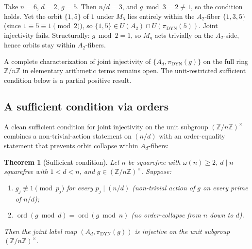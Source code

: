 \documentclass[11pt,reqno]{amsart}
\theoremstyle{plain}
\newtheorem{theorem}{Theorem}[section]
\theoremstyle{definition}
\theoremstyle{remark}
\DeclareMathOperator{\ord}{ord}
\DeclareMathOperator{\dyn}{DYN}
\newcommand{\Z}{\mathbb{Z}}
\begin{document}
\begin{example}\label{ex:converse-fails}
Take $n = 6$, $d = 2$, $g = 5$. Then $n/d = 3$, and $g \bmod 3 = 2
\not\equiv 1$, so the condition holds. Yet the orbit $\{1, 5\}$ of
$1$ under $M_{5}$ lies entirely within the $A_{2}$-fiber $\{1, 3, 5\}$
(since $1 \equiv 5 \equiv 1 \pmod 2$), so $\{1, 5\} \in U(A_{2})
\cap U(\pi_{\dyn}(5))$. Joint injectivity fails. Structurally: $g
\bmod 2 = 1$, so $M_{g}$ acts trivially on the $A_{2}$-side, hence
orbits stay within $A_{2}$-fibers.
\end{example}

A complete characterization of joint injectivity of $\{A_{d},
\pi_{\dyn}(g)\}$ on the full ring $\Z/n\Z$ in elementary
arithmetic terms remains open. The unit-restricted sufficient
condition below is a partial positive result.

\subsection{A sufficient condition via orders}

A clean sufficient condition for joint injectivity on the unit
subgroup $(\Z/n\Z)^{\times}$ combines a non-trivial-action statement
on $(n/d)$ with an order-equality statement that prevents orbit
collapse within $A_{d}$-fibers:

\begin{theorem}[Sufficient condition]\label{thm:joint-sufficient}
Let $n$ be squarefree with $\omega(n) \ge 2$, $d \mid n$ squarefree
with $1 < d < n$, and $g \in (\Z/n\Z)^{\times}$. Suppose:
\begin{enumerate}[label={\upshape(\roman*)}]
\item $g_{j} \not\equiv 1 \pmod{p_{j}}$ for every $p_{j} \mid (n/d)$
\quad (non-trivial action of $g$ on every prime of $n/d$);
\item $\ord(g \bmod d) = \ord(g \bmod n)$
\quad (no order-collapse from $n$ down to $d$).
\end{enumerate}
Then the joint label map $(A_{d}, \pi_{\dyn}(g))$ is injective on
the unit subgroup $(\Z/n\Z)^{\times}$.
\end{theorem}
\end{document}
